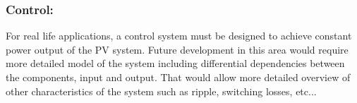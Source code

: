 \subsubsection{Control:}
For real life applications, a control system must be designed to achieve constant power output of the PV system. Future development in this area would require more detailed model of the system including differential dependencies between the components, input and output. That would allow more detailed overview of other characteristics of the system such as ripple, switching losses, etc...
